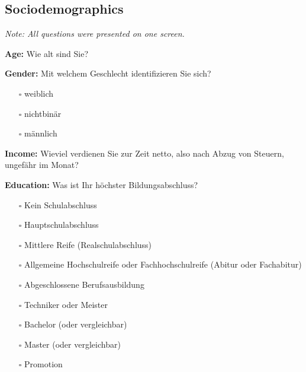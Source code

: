 \documentclass[egregdoesnotlikesansseriftitles]{scrartcl}
\begin{document}
\subsection*{Sociodemographics}
\textit{Note: All questions were presented on one screen.}

\vspace{1em}
\noindent\textbf{Age:} Wie alt sind Sie?

\vspace{1em}
\noindent\textbf{Gender:} Mit welchem Geschlecht identifizieren Sie sich?
\begin{itemize}
   \item[$\square$] weiblich
   \item[$\square$] nichtbinär
   \item[$\square$] männlich
\end{itemize}

\vspace{1em}
\noindent\textbf{Income:} Wieviel verdienen Sie zur Zeit netto, also nach Abzug von Steuern, ungefähr im Monat?

\vspace{1em}
\noindent\textbf{Education:} Was ist Ihr höchster Bildungsabschluss?
\begin{itemize}
   \item[$\square$] Kein Schulabschluss
   \item[$\square$] Hauptschulabschluss
   \item[$\square$] Mittlere Reife (Realschulabschluss)
   \item[$\square$] Allgemeine Hochschulreife oder Fachhochschulreife (Abitur oder Fachabitur)
   \item[$\square$] Abgeschlossene Berufsausbildung
   \item[$\square$] Techniker oder Meister
   \item[$\square$] Bachelor (oder vergleichbar)
   \item[$\square$] Master (oder vergleichbar)
   \item[$\square$] Promotion
\end{itemize}
\end{document}
